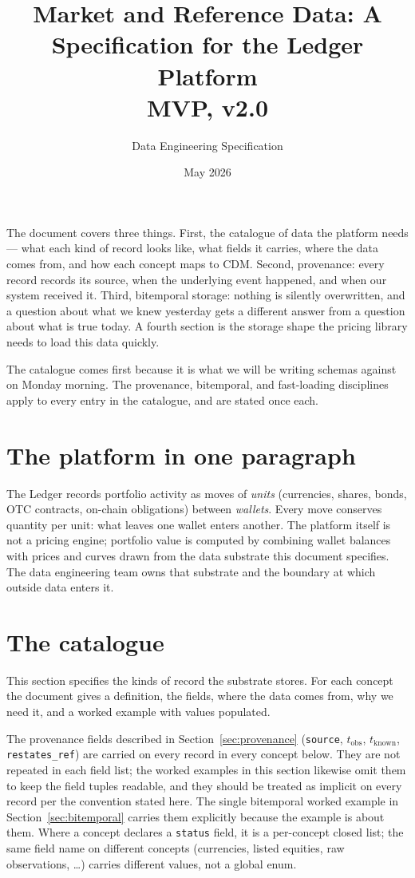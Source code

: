 \documentclass[11pt,a4paper]{article}
\title{Market and Reference Data: A Specification for the Ledger Platform\\[4pt]
\large MVP, v2.0}
\author{Data Engineering Specification}
\date{May 2026}
\begin{document}
\maketitle

\noindent The document covers three things. First, the catalogue of data the platform needs --- what each kind of record looks like, what fields it carries, where the data comes from, and how each concept maps to CDM. Second, provenance: every record records its source, when the underlying event happened, and when our system received it. Third, bitemporal storage: nothing is silently overwritten, and a question about what we knew yesterday gets a different answer from a question about what is true today. A fourth section is the storage shape the pricing library needs to load this data quickly.

The catalogue comes first because it is what we will be writing schemas against on Monday morning. The provenance, bitemporal, and fast-loading disciplines apply to every entry in the catalogue, and are stated once each.

\section{The platform in one paragraph}

The Ledger records portfolio activity as moves of \emph{units} (currencies, shares, bonds, OTC contracts, on-chain obligations) between \emph{wallets}. Every move conserves quantity per unit: what leaves one wallet enters another. The platform itself is not a pricing engine; portfolio value is computed by combining wallet balances with prices and curves drawn from the data substrate this document specifies. The data engineering team owns that substrate and the boundary at which outside data enters it.

\section{The catalogue}\label{sec:catalogue}

This section specifies the kinds of record the substrate stores. For each concept the document gives a definition, the fields, where the data comes from, why we need it, and a worked example with values populated.

The provenance fields described in Section~\ref{sec:provenance} (\texttt{source}, $t_\text{obs}$, $t_\text{known}$, \texttt{restates\_ref}) are carried on every record in every concept below. They are not repeated in each field list; the worked examples in this section likewise omit them to keep the field tuples readable, and they should be treated as implicit on every record per the convention stated here. The single bitemporal worked example in Section~\ref{sec:bitemporal} carries them explicitly because the example is about them. Where a concept declares a \texttt{status} field, it is a per-concept closed list; the same field name on different concepts (currencies, listed equities, raw observations, \ldots) carries different values, not a global enum.
\end{document}
